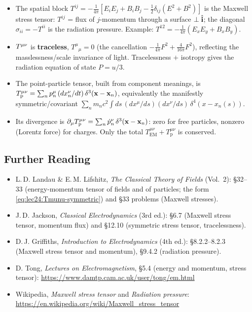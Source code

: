 \begin{itemize}
  \item The spatial block $T^{ij}=-\tfrac{1}{4\pi}[E_iE_j+B_iB_j-\tfrac12\delta_{ij}(E^2+B^2)]$
        is the Maxwell stress tensor: $T^{ij}$ = flux of $j$-momentum through a surface
        $\perp\hat{\mathbf{i}}$; the diagonal $\sigma_{ii}=-T^{ii}$ is the radiation pressure.
        Example: $T^{12}=-\tfrac{1}{4\pi}(E_xE_y+B_xB_y)$.
  \item $T^{\mu\nu}$ is \textbf{traceless}, $T^\mu{}_\mu=0$ (the cancellation
        $-\tfrac{1}{4\pi}F^2+\tfrac{4}{16\pi}F^2$), reflecting the masslessness/scale
        invariance of light. Tracelessness $+$ isotropy gives the radiation equation of
        state $P=u/3$.
  \item The point-particle tensor, built from component meanings, is
        $T^{\mu\nu}_{\text{p}}=\sum_n p_n^\mu\,(dx_n^\nu/dt)\,\delta^3(\mathbf{x}-\mathbf{x}_n)$,
        equivalently the manifestly symmetric/covariant
        $\sum_n m_nc^2\int ds\,(dx^\mu/ds)(dx^\nu/ds)\,\delta^4(x-x_n(s))$.
  \item Its divergence is $\partial_\mu T^{\mu\nu}_{\text{p}}=\sum_n\dot p_n^\nu\,
        \delta^3(\mathbf{x}-\mathbf{x}_n)$: zero for free particles, nonzero (Lorentz force) for
        charges. Only the total $T^{\mu\nu}_{\text{EM}}+T^{\mu\nu}_{\text{p}}$ is conserved.
\end{itemize}

\subsection*{Further Reading}
\begin{itemize}
  \item L.\,D. Landau \& E.\,M. Lifshitz, \textit{The Classical Theory of Fields}
        (Vol.~2): §32--33 (energy-momentum tensor of fields and of particles;
        the form \eqref{eq:lec24:Tmunu-symmetric}) and §33 problems (Maxwell stresses).
  \item J.\,D. Jackson, \textit{Classical Electrodynamics} (3rd ed.): §6.7
        (Maxwell stress tensor, momentum flux) and §12.10 (symmetric stress tensor,
        tracelessness).
  \item D.\,J. Griffiths, \textit{Introduction to Electrodynamics} (4th ed.): §8.2.2--8.2.3
        (Maxwell stress tensor and momentum), §9.4.2 (radiation pressure).
  \item D. Tong, \textit{Lectures on Electromagnetism}, §5.4
        (energy and momentum, stress tensor): \url{https://www.damtp.cam.ac.uk/user/tong/em.html}
  \item Wikipedia, \textit{Maxwell stress tensor} and \textit{Radiation pressure}:
        \url{https://en.wikipedia.org/wiki/Maxwell_stress_tensor}
\end{itemize}
